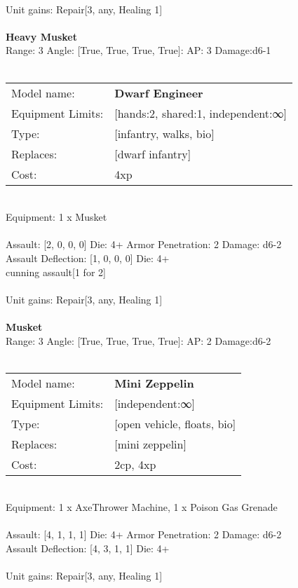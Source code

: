 \ \\
Unit gains: Repair[3, any, Healing 1]\\ 

\ \\
{\bf Heavy Musket } \\



Range: 3  Angle: [True, True, True, True]: AP: 3 Damage:d6-1 \\




 
\ \\

\noindent
\begin{tabular}{ll}
Model name: &{\bf Dwarf Engineer } \\
Equipment Limits: &[hands:2, shared:1, independent:∞] \\
Type: &[infantry, walks, bio] \\
Replaces: &[dwarf infantry] \\
Cost: & 4xp\\
\end{tabular}
\ \\
Equipment: 1 x Musket \\
\ \\
Assault: [2, 0, 0, 0] Die: 4+ Armor Penetration: 2 Damage: d6-2 \\
Assault Deflection: [1, 0, 0, 0] Die: 4+\\
\indent cunning assault[1 for 2]\\ 
 
\ \\
Unit gains: Repair[3, any, Healing 1]\\ 

\ \\
{\bf Musket } \\



Range: 3  Angle: [True, True, True, True]: AP: 2 Damage:d6-2 \\




 
\ \\

\noindent
\begin{tabular}{ll}
Model name: &{\bf Mini Zeppelin } \\
Equipment Limits: &[independent:∞] \\
Type: &[open vehicle, floats, bio] \\
Replaces: &[mini zeppelin] \\
Cost: & 2cp, 4xp\\
\end{tabular}
\ \\
Equipment: 1 x AxeThrower Machine, 1 x Poison Gas Grenade \\
\ \\
Assault: [4, 1, 1, 1] Die: 4+ Armor Penetration: 2 Damage: d6-2 \\
Assault Deflection: [4, 3, 1, 1] Die: 4+\\
\indent  
\ \\
Unit gains: Repair[3, any, Healing 1]\\ 

